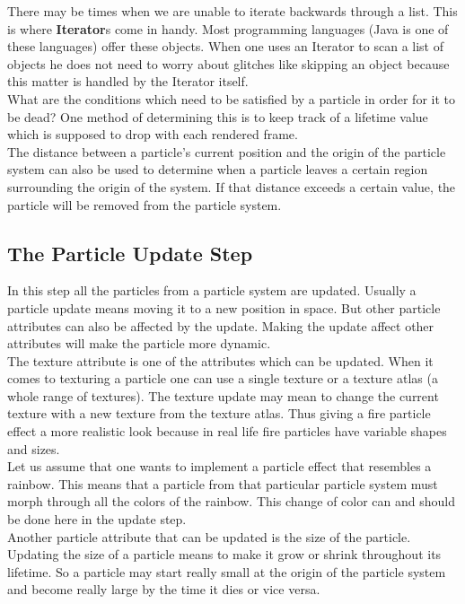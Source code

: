 There may be times when we are unable to iterate backwards through a list. This is where \textbf{Iterator}s come in handy. Most programming languages (Java is one of these languages) offer these objects. When one uses an Iterator to scan a list of objects he does not need to worry about glitches like skipping an object because this matter is handled by the Iterator itself.\\

What are the conditions which need to be satisfied by a particle in order for it to be dead? One method of determining this is to keep track of a lifetime value which is supposed to drop with each rendered frame.\\

The distance between a particle's current position and the origin of the particle system can also be used to determine when a particle leaves a certain region surrounding the origin of the system. If that distance exceeds a certain value, the particle will be removed from the particle system.\\

\newpage
\subsection{The Particle Update Step}
In this step all the particles from a particle system are updated. Usually a particle update means moving it to a new position in space. But other particle attributes can also be affected by the update. Making the update affect other attributes will make the particle more dynamic.\\

The texture attribute is one of the attributes which can be updated. When it comes to texturing a particle one can use a single texture or a texture atlas (a whole range of textures). The texture update may mean to change the current texture with a new texture from the texture atlas. Thus giving a fire particle effect a more realistic look because in real life fire particles have variable shapes and sizes.\\

Let us assume that one wants to implement a particle effect that resembles a rainbow. This means that a particle from that particular particle system must morph through all the colors of the rainbow. This change of color can and should be done here in the update step.\\

Another particle attribute that can be updated is the size of the particle. Updating the size of a particle means to make it grow or shrink throughout its lifetime. So a particle may start really small at the origin of the particle system and become really large by the time it dies or vice versa.

